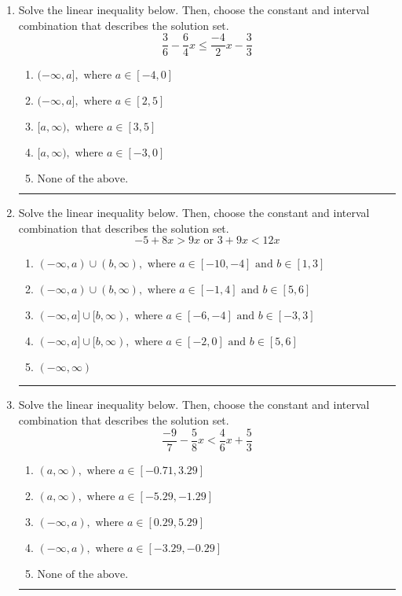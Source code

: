 \documentclass[14pt]{extbook}
\newcommand{\litem}[1]{\item#1\hspace*{-1cm}\rule{\textwidth}{0.4pt}}
\begin{document}
\begin{enumerate}
{\begin{enumerate}[label=\Alph*.]
\end{enumerate} }
\litem{
Solve the linear inequality below. Then, choose the constant and interval combination that describes the solution set.\[ \frac{3}{6} - \frac{6}{4} x \leq \frac{-4}{2} x - \frac{3}{3} \]\begin{enumerate}[label=\Alph*.]
\item \( (-\infty, a], \text{ where } a \in [-4, 0] \)
\item \( (-\infty, a], \text{ where } a \in [2, 5] \)
\item \( [a, \infty), \text{ where } a \in [3, 5] \)
\item \( [a, \infty), \text{ where } a \in [-3, 0] \)
\item \( \text{None of the above}. \)

\end{enumerate} }
\litem{
Solve the linear inequality below. Then, choose the constant and interval combination that describes the solution set.\[ -5 + 8 x > 9 x \text{ or } 3 + 9 x < 12 x \]\begin{enumerate}[label=\Alph*.]
\item \( (-\infty, a) \cup (b, \infty), \text{ where } a \in [-10, -4] \text{ and } b \in [1, 3] \)
\item \( (-\infty, a) \cup (b, \infty), \text{ where } a \in [-1, 4] \text{ and } b \in [5, 6] \)
\item \( (-\infty, a] \cup [b, \infty), \text{ where } a \in [-6, -4] \text{ and } b \in [-3, 3] \)
\item \( (-\infty, a] \cup [b, \infty), \text{ where } a \in [-2, 0] \text{ and } b \in [5, 6] \)
\item \( (-\infty, \infty) \)

\end{enumerate} }
\litem{
Solve the linear inequality below. Then, choose the constant and interval combination that describes the solution set.\[ \frac{-9}{7} - \frac{5}{8} x < \frac{4}{6} x + \frac{5}{3} \]\begin{enumerate}[label=\Alph*.]
\item \( (a, \infty), \text{ where } a \in [-0.71, 3.29] \)
\item \( (a, \infty), \text{ where } a \in [-5.29, -1.29] \)
\item \( (-\infty, a), \text{ where } a \in [0.29, 5.29] \)
\item \( (-\infty, a), \text{ where } a \in [-3.29, -0.29] \)
\item \( \text{None of the above}. \)


\end{enumerate}}
\end{enumerate}
\end{document}
